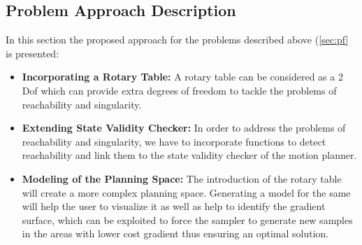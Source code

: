 \subsection{Problem Approach Description}
In this section the proposed approach for the problems described above (\ref{sec:pf} is presented:

\begin{itemize}
\item \textbf{Incorporating a Rotary Table:} A rotary table can be considered as a 2 Dof which can provide extra degrees of freedom to tackle the problems of reachability and singularity. 
\item \textbf{Extending State Validity Checker:} In order to address the problems of reachability and singularity, we have to incorporate functions to detect reachability and link them to the state validity checker of the motion planner.
\item \textbf{Modeling of the Planning Space:} The introduction of the rotary table will create a more complex planning space. Generating a model for the same will help the user to visualize it as well as help to identify the gradient surface, which can be exploited to force the sampler to generate new samples in the areas with lower cost gradient thus ensuring an optimal solution.
\end{itemize}